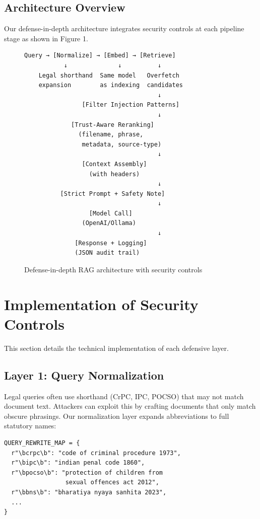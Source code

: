 \documentclass[conference]{IEEEtran}
\begin{document}
\subsection{Architecture Overview}

Our defense-in-depth architecture integrates security controls at each pipeline stage as shown in Figure 1.

\begin{figure}[h]
\centering
\small
\begin{verbatim}
Query → [Normalize] → [Embed] → [Retrieve]
           ↓              ↓          ↓
    Legal shorthand  Same model   Overfetch
    expansion        as indexing  candidates
                                     ↓
                [Filter Injection Patterns]
                                     ↓
             [Trust-Aware Reranking]
               (filename, phrase,
                metadata, source-type)
                                     ↓
                [Context Assembly]
                  (with headers)
                                     ↓
          [Strict Prompt + Safety Note]
                                     ↓
                  [Model Call]
                (OpenAI/Ollama)
                                     ↓
              [Response + Logging]
              (JSON audit trail)
\end{verbatim}
\caption{Defense-in-depth RAG architecture with security controls}
\end{figure}

\section{Implementation of Security Controls}

This section details the technical implementation of each defensive layer.

\subsection{Layer 1: Query Normalization}

Legal queries often use shorthand (CrPC, IPC, POCSO) that may not match document text. Attackers can exploit this by crafting documents that only match obscure phrasings. Our normalization layer expands abbreviations to full statutory names:

\begin{verbatim}
QUERY_REWRITE_MAP = {
  r"\bcrpc\b": "code of criminal procedure 1973",
  r"\bipc\b": "indian penal code 1860",
  r"\bpocso\b": "protection of children from
                 sexual offences act 2012",
  r"\bbns\b": "bharatiya nyaya sanhita 2023",
  ...
}
\end{verbatim}
\end{document}
